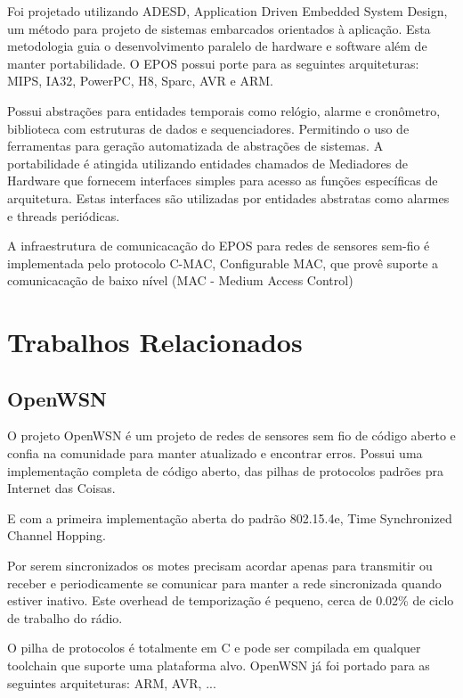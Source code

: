 Foi projetado utilizando ADESD, Application Driven Embedded System Design, um m\'etodo para projeto de sistemas embarcados orientados \`a aplica\c{c}\~ao. Esta metodologia guia o desenvolvimento paralelo de hardware e software al\'em de manter portabilidade. O EPOS possui porte para as seguintes arquiteturas: MIPS, IA32, PowerPC, H8, Sparc, AVR e ARM. \cite{epos}

Possui abstra\c{c}\~oes para entidades temporais como rel\'ogio, alarme e cron\^ometro, biblioteca com estruturas de dados e sequenciadores. Permitindo o uso de ferramentas para gera\c{c}\~ao automatizada de abstra\c{c}\~oes de sistemas. A portabilidade \'e atingida utilizando entidades chamados de Mediadores de Hardware que fornecem interfaces simples para acesso as fun\c{c}\~oes espec\'ificas de arquitetura. Estas interfaces s\~ao utilizadas por entidades abstratas como alarmes e threads peri\'odicas.


A infraestrutura de comunicaca\c{c}\~ao do EPOS para redes de sensores sem-fio \'e implementada pelo protocolo C-MAC, Configurable MAC, que prov\^e suporte a comunicaca\c{c}\~ao de baixo n\'ivel (MAC - Medium Access Control)

\section{Trabalhos Relacionados}

\subsection{OpenWSN}

O projeto OpenWSN \'e um projeto de redes de sensores sem fio de c\'odigo aberto e confia na comunidade para manter atualizado e encontrar erros. Possui uma implementa\c{c}\~ao completa de c\'odigo aberto, das pilhas de protocolos padr\~oes pra Internet das Coisas.

E com a primeira implementa\c{c}\~ao aberta do padr\~ao 802.15.4e, Time Synchronized Channel Hopping.

Por serem sincronizados os motes precisam acordar apenas para transmitir ou receber e periodicamente se comunicar para manter a rede sincronizada quando estiver inativo. Este overhead de temporiza\c{c}\~ao \'e pequeno, cerca de 0.02\% de ciclo de trabalho do r\'adio. \cite{openWSNPaper}

O pilha de protocolos \'e totalmente em C e pode ser compilada em qualquer toolchain que suporte uma plataforma alvo. OpenWSN j\'a foi portado para as seguintes arquiteturas: ARM, AVR, ...

